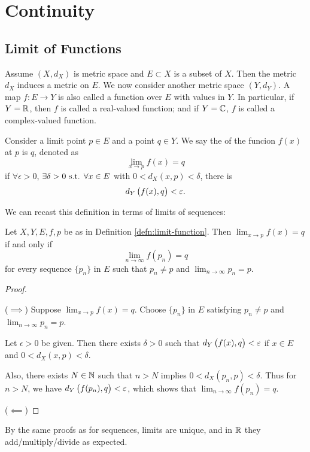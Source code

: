 \chapter{Continuity}
\section{Limit of Functions}
Assume $(X,d_X)$ is metric space and $E\subset X$ is a subset of $X$. Then the metric $d_X$ induces a metric on $E$. We now consider another metric space $(Y,d_Y)$. A map $f:E\to Y$ is also called a function over $E$ with values in $Y$. In particular, if $Y=\mathbb R$, then $f$ is called a real-valued function; and if $Y=\mathbb C$, $f$ is called a complex-valued function.

\begin{definition}\label{defn:limit-function}
Consider a limit point $p\in E$ and a point $q\in Y$. We say the  of the funcion $f(x)$ at $p$ is $q$, denoted as
\[ \lim_{x\to p}f(x)=q \]
if $\forall\epsilon>0$, $\exists\delta>0\text{ s.t. }\forall x\in E$ with $0<d_X(x,p)<\delta$, there is
\[ d_Y\left(f(x), q\right)<\varepsilon. \]
\end{definition}

We can recast this definition in terms of limits of sequences:
\begin{proposition}
Let $X,Y,E,f,p$ be as in Definition \ref{defn:limit-function}. Then $\displaystyle\lim_{x\to p}f(x)=q$ if and only if
\[\lim_{n\to\infty}f(p_n)=q\]
for every sequence $\{p_n\}$ in $E$ such that $p_n \neq p$ and $\displaystyle\lim_{n\to\infty}p_n=p$.
\end{proposition}

\begin{proof} \

($\implies$) Suppose $\displaystyle\lim_{x\to p}f(x)=q$. Choose $\{p_n\}$ in $E$ satisfying $p_n \neq p$ and $\displaystyle\lim_{n\to\infty}p_n=p$.

Let $\epsilon>0$ be given. Then there exists $\delta>0$ such that $d_Y\left(f(x),q\right)<\varepsilon$ if $x\in E$ and $0<d_X(x,p)<\delta$.

Also, there exists $N\in\mathbb N$ such that $n>N$ implies $0<d_X(p_n,p)<\delta$. Thus for $n>N$, we have $d_Y\left(f(p_n),q\right)<\varepsilon$, which shows that $\displaystyle\lim_{n\to\infty}f(p_n)=q$.

($\impliedby$) 
\end{proof}

By the same proofs as for sequences, limits are unique, and in $\mathbb R$ they add/multiply/divide as expected.

